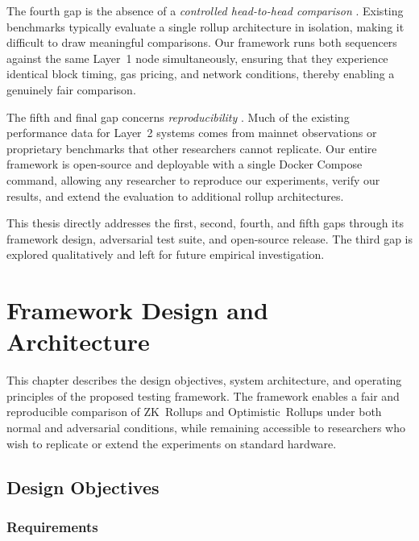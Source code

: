 \documentclass[
]{elteikthesis}[2024/04/26]
\begin{document}
The fourth gap is the absence of a \textit{controlled head-to-head comparison} \label{gap:comparison}. Existing benchmarks typically evaluate a single rollup architecture in isolation, making it difficult to draw meaningful comparisons. Our framework runs both sequencers against the same Layer~1 node simultaneously, ensuring that they experience identical block timing, gas pricing, and network conditions, thereby enabling a genuinely fair comparison.

The fifth and final gap concerns \textit{reproducibility} \label{gap:reproducibility}. Much of the existing performance data for Layer~2 systems comes from mainnet observations or proprietary benchmarks that other researchers cannot replicate. Our entire framework is open-source and deployable with a single Docker Compose command, allowing any researcher to reproduce our experiments, verify our results, and extend the evaluation to additional rollup architectures.

This thesis directly addresses the first, second, fourth, and fifth gaps through its framework design, adversarial test suite, and open-source release. The third gap is explored qualitatively and left for future empirical investigation.

\cleardoublepage

\chapter{Framework Design and Architecture}
\label{ch:framework}

This chapter describes the design objectives, system architecture, and operating principles of the proposed testing framework. The framework enables a fair and reproducible comparison of ZK~Rollups and Optimistic~Rollups under both normal and adversarial conditions, while remaining accessible to researchers who wish to replicate or extend the experiments on standard hardware.

\section{Design Objectives}

\subsection{Requirements}
\end{document}
